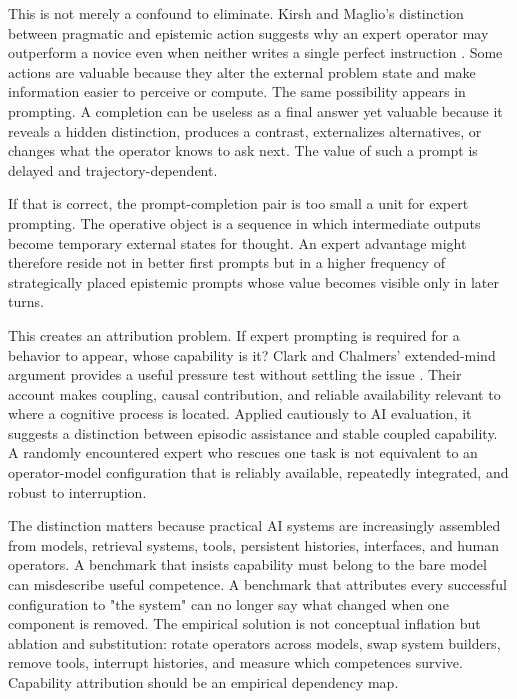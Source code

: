\documentclass[11pt]{article}
\begin{document}
This is not merely a confound to eliminate. Kirsh and Maglio's distinction between pragmatic and epistemic action suggests why an expert operator may outperform a novice even when neither writes a single perfect instruction \cite{kirsh1994distinguishing}. Some actions are valuable because they alter the external problem state and make information easier to perceive or compute. The same possibility appears in prompting. A completion can be useless as a final answer yet valuable because it reveals a hidden distinction, produces a contrast, externalizes alternatives, or changes what the operator knows to ask next. The value of such a prompt is delayed and trajectory-dependent.

If that is correct, the prompt-completion pair is too small a unit for expert prompting. The operative object is a sequence in which intermediate outputs become temporary external states for thought. An expert advantage might therefore reside not in better first prompts but in a higher frequency of strategically placed epistemic prompts whose value becomes visible only in later turns.

This creates an attribution problem. If expert prompting is required for a behavior to appear, whose capability is it? Clark and Chalmers' extended-mind argument provides a useful pressure test without settling the issue \cite{clark1998extended}. Their account makes coupling, causal contribution, and reliable availability relevant to where a cognitive process is located. Applied cautiously to AI evaluation, it suggests a distinction between episodic assistance and stable coupled capability. A randomly encountered expert who rescues one task is not equivalent to an operator-model configuration that is reliably available, repeatedly integrated, and robust to interruption.

The distinction matters because practical AI systems are increasingly assembled from models, retrieval systems, tools, persistent histories, interfaces, and human operators. A benchmark that insists capability must belong to the bare model can misdescribe useful competence. A benchmark that attributes every successful configuration to "the system" can no longer say what changed when one component is removed. The empirical solution is not conceptual inflation but ablation and substitution: rotate operators across models, swap system builders, remove tools, interrupt histories, and measure which competences survive. Capability attribution should be an empirical dependency map.
\end{document}
